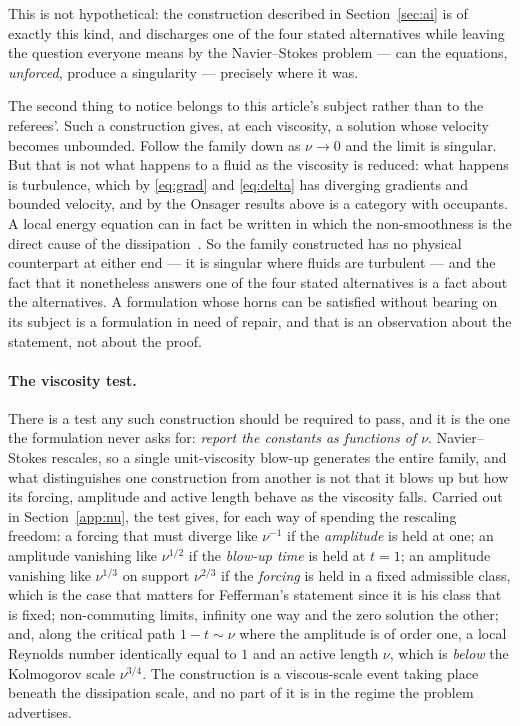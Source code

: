 \documentclass[11pt]{article}
\begin{document}
This is not hypothetical: the construction described in Section~\ref{sec:ai} is of exactly this kind,
and discharges one of the four stated alternatives while leaving the question everyone means by the
Navier--Stokes problem --- can the equations, \emph{unforced}, produce a singularity --- precisely
where it was.

The second thing to notice belongs to this article's subject rather than to the referees'. Such a construction gives, at each viscosity, a solution whose velocity becomes
unbounded. Follow the family down as $\nu\to0$ and the limit is singular. But that is not what
happens to a fluid as the viscosity is reduced: what happens is turbulence, which by
\eqref{eq:grad} and \eqref{eq:delta} has diverging gradients and bounded velocity, and by the
Onsager results above is a category with occupants. A local energy equation can in fact be written in which the
non-smoothness is the direct cause of the dissipation~\cite{duchonrobert}. So the family constructed has no physical
counterpart at either end --- it is singular where fluids are turbulent --- and the fact that it
nonetheless answers one of the four stated alternatives is a fact about the alternatives. A formulation whose horns can be satisfied without bearing on its subject is a formulation in
need of repair, and that is an observation about the statement, not about the proof.

\paragraph{The viscosity test.} There is a test any such construction should be required to pass,
and it is the one the formulation never asks for: \emph{report the constants as functions of $\nu$}.
Navier--Stokes rescales, so a single unit-viscosity blow-up generates the entire family, and what
distinguishes one construction from another is not that it blows up but how its forcing, amplitude
and active length behave as the viscosity falls. Carried out in Section~\ref{app:nu}, the test
gives, for each way of spending the rescaling freedom: a forcing that must diverge like $\nu^{-1}$ if
the \emph{amplitude} is held at one; an amplitude vanishing like $\nu^{1/2}$ if the \emph{blow-up
time} is held at $t=1$; an amplitude vanishing like $\nu^{1/3}$ on support $\nu^{2/3}$ if the
\emph{forcing} is held in a fixed admissible class, which is the case that matters for
Fefferman's statement since it is his class that is fixed; non-commuting limits, infinity
one way and the zero solution the other; and, along the critical path $1-t\sim\nu$ where the
amplitude is of order one, a local Reynolds number identically equal to $1$ and an active length
$\nu$, which is \emph{below} the Kolmogorov scale $\nu^{3/4}$. The construction is a viscous-scale
event taking place beneath the dissipation scale, and no part of it is in the regime the problem
advertises.
\end{document}

